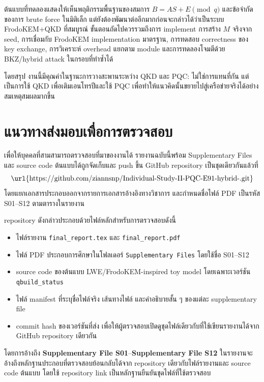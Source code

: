\documentclass[14pt,a4paper]{extarticle}
\newcommand{\eng}[1]{\textenglish{#1}}
\newcommand{\code}[1]{\texttt{#1}}
\newcommand{\suppfile}[1]{\textbf{Supplementary File #1}}
\begin{document}
ต้นแบบที่ทดลองแสดงให้เห็นพฤติกรรมพื้นฐานของสมการ $B=AS+E \pmod q$ และข้อจำกัดของการ brute force ในมิติเล็ก แต่ยังต้องพัฒนาต่ออีกมากก่อนจะกล่าวได้ว่าเป็นระบบ FrodoKEM+QKD ที่สมบูรณ์ ขั้นตอนถัดไปควรรวมถึงการ implement การสร้าง $M$ จริงจาก seed, การเชื่อมกับ FrodoKEM implementation มาตรฐาน, การทดสอบ correctness ของ key exchange, การวิเคราะห์ overhead แยกตาม module และการทดลองโจมตีด้วย BKZ/hybrid attack ในกรอบที่ทำซ้ำได้

โดยสรุป งานนี้มีคุณค่าในฐานะการวางสะพานระหว่าง QKD และ PQC: ไม่ใช่การแทนที่กัน แต่เป็นการใช้ QKD เพื่อเติมเอนโทรปีและใช้ PQC เพื่อทำให้แนวคิดนั้นขยายไปสู่เครือข่ายจริงได้อย่างสมเหตุสมผลมากขึ้น

\section{แนวทางส่งมอบเพื่อการตรวจสอบ}
เพื่อให้บุคคลที่สามสามารถตรวจสอบที่มาของงานได้ รายงานฉบับนี้พร้อม \eng{Supplementary Files} และ source code ต้นแบบได้ถูกจัดเก็บและ push ขึ้น GitHub repository เป็นชุดเดียวกันแล้วที่
\[
    \text{\url{https://github.com/ziannsnp/Individual-Study-II-PQC-E91-hybrid-.git}}
\]
โดยแยกเอกสารประกอบออกจากรายการเอกสารอ้างอิงทางวิชาการ และกำหนดชื่อไฟล์ PDF เป็นรหัส S01--S12 ตามตารางในรายงาน

repository ดังกล่าวประกอบด้วยไฟล์หลักสำหรับการตรวจสอบดังนี้
\begin{itemize}
    \item ไฟล์รายงาน \code{final\_report.tex} และ \code{final\_report.pdf}
    \item ไฟล์ PDF ประกอบการศึกษาในโฟลเดอร์ \code{Supplementary Files} โดยใช้ชื่อ S01--S12
    \item source code ของต้นแบบ LWE/FrodoKEM-inspired toy model โดยเฉพาะเวอร์ชัน \code{qbuild\_status}
    \item ไฟล์ manifest ที่ระบุชื่อไฟล์จริง เส้นทางไฟล์ และคำอธิบายสั้น ๆ ของแต่ละ supplementary file
    \item commit hash ของเวอร์ชันที่ส่ง เพื่อให้ผู้ตรวจสอบเปิดดูชุดไฟล์เดียวกับที่ใช้เขียนรายงานได้จาก GitHub repository เดียวกัน
\end{itemize}

โดยการอ้างถึง \suppfile{S01}--\suppfile{S12} ในรายงานจะอ้างถึงหลักฐานประกอบที่ตรวจสอบย้อนกลับได้จาก repository เดียวกับไฟล์รายงานและ source code ต้นแบบ โดยใช้ repository link เป็นหลักฐานยืนยันชุดไฟล์ที่ใช้ตรวจสอบ

\clearpage
\end{document}
